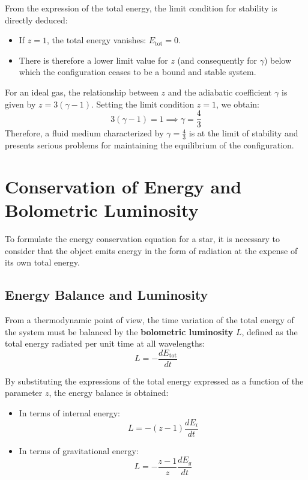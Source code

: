 From the expression of the total energy, the limit condition for stability is directly deduced:
\begin{itemize}
\item If $z = 1$, the total energy vanishes: $E_{\text{tot}} = 0$.
\item There is therefore a lower limit value for $z$ (and consequently for $\gamma$) below which the configuration ceases to be a bound and stable system.
\end{itemize}

For an ideal gas, the relationship between $z$ and the adiabatic coefficient $\gamma$ is given by $z = 3(\gamma - 1)$. Setting the limit condition $z = 1$, we obtain:
\begin{equation}
3(\gamma - 1) = 1 \implies \gamma = \frac{4}{3}
\end{equation}
Therefore, a fluid medium characterized by $\gamma = \frac{4}{3}$ is at the limit of stability and presents serious problems for maintaining the equilibrium of the configuration.

\section{Conservation of Energy and Bolometric Luminosity}

To formulate the energy conservation equation for a star, it is necessary to consider that the object emits energy in the form of radiation at the expense of its own total energy.

\subsection{Energy Balance and Luminosity}
From a thermodynamic point of view, the time variation of the total energy of the system must be balanced by the \textbf{bolometric luminosity} $L$, defined as the total energy radiated per unit time at all wavelengths:
\begin{equation}
L = -\frac{d E_{\text{tot}}}{dt}
\end{equation}

By substituting the expressions of the total energy expressed as a function of the parameter $z$, the energy balance is obtained:
\begin{itemize}
\item In terms of internal energy:
\begin{equation}
L = -(z - 1) \frac{d E_i}{dt}
\end{equation}
\item In terms of gravitational energy:
\begin{equation}
L = -\frac{z - 1}{z} \frac{d E_g}{dt}
\end{equation}
\end{itemize}

